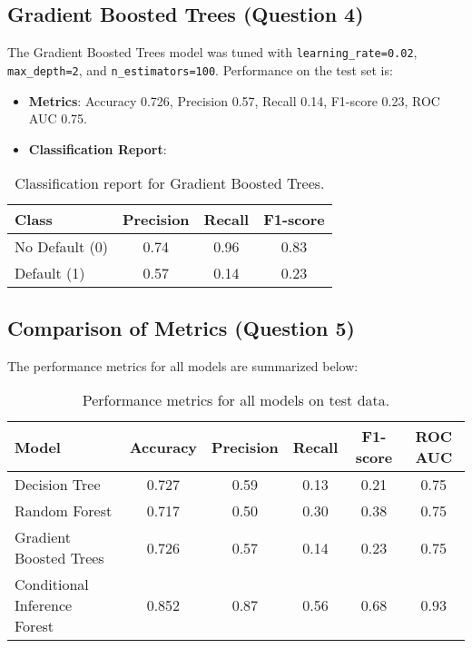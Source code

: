 \documentclass[a4paper,12pt,headsepline]{scrartcl} %
\begin{document}
\subsection{Gradient Boosted Trees (Question 4)}
The Gradient Boosted Trees model was tuned with \texttt{learning\_rate=0.02}, \texttt{max\_depth=2}, and \texttt{n\_estimators=100}. Performance on the test set is:
\begin{itemize}
    \item \textbf{Metrics}: Accuracy 0.726, Precision 0.57, Recall 0.14, F1-score 0.23, ROC AUC 0.75.
    \item \textbf{Classification Report}:
\end{itemize}

\begin{table}[h]
\centering
\begin{tabular}{lccc}
\toprule
Class & Precision & Recall & F1-score \\
\midrule
No Default (0) & 0.74 & 0.96 & 0.83 \\
Default (1) & 0.57 & 0.14 & 0.23 \\
\bottomrule
\end{tabular}
\caption{Classification report for Gradient Boosted Trees.}
\label{tab:gbt_classification}
\end{table}

\subsection{Comparison of Metrics (Question 5)}
The performance metrics for all models are summarized below:

\begin{table}[h]
\centering
\begin{tabular}{lccccc}
\toprule
Model & Accuracy & Precision & Recall & F1-score & ROC AUC \\
\midrule
Decision Tree & 0.727 & 0.59 & 0.13 & 0.21 & 0.75 \\
Random Forest & 0.717 & 0.50 & 0.30 & 0.38 & 0.75 \\
Gradient Boosted Trees & 0.726 & 0.57 & 0.14 & 0.23 & 0.75 \\
Conditional Inference Forest & 0.852 & 0.87 & 0.56 & 0.68 & 0.93 \\
\bottomrule
\end{tabular}
\caption{Performance metrics for all models on test data.}
\label{tab:performance_comparison}
\end{table}
\end{document}
